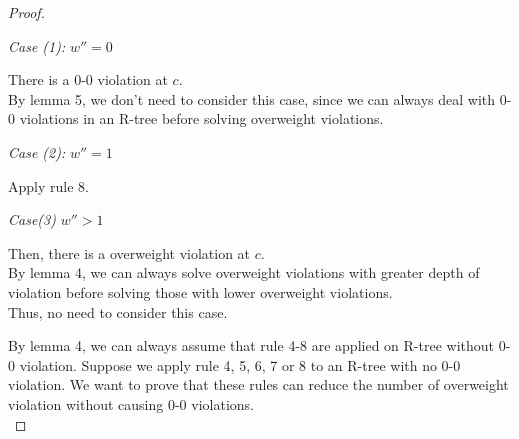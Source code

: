 \documentclass[10pt]{article}
\begin{document}
\begin{enumerate}
\begin{proof}
\begin{addmargin}[1em]{0em}
\begin{addmargin}[1em]{0em}
			\textit{Case (1):} $w'' = 0$
			\begin{addmargin}[1em]{0em}
				There is a 0-0 violation at $c$. \\
				By lemma 5, we don't need to consider this case, since we can always deal with 0-0 violations in an R-tree before solving overweight violations.
			\end{addmargin}
			\textit{Case (2):} $w'' = 1$
			\begin{addmargin}[1em]{0em}
				Apply rule 8.
			\end{addmargin}
			\textit{Case(3)} $w'' > 1$
			\begin{addmargin}[1em]{0em}
				Then, there is a overweight violation at $c$. \\
				By lemma 4, we can always solve overweight violations with greater depth of violation before solving those with lower overweight violations. \\
				Thus, no need to consider this case.
			\end{addmargin}
		\end{addmargin}
	\end{addmargin}

	By lemma 4, we can always assume that rule 4-8 are applied on R-tree
	without 0-0 violation. Suppose we apply rule 4, 5, 6, 7 or 8 to an R-tree
	with no 0-0 violation. We want to prove that these rules can reduce the
	number of overweight violation without causing 0-0 violations. \\


\end{proof}
\end{enumerate}
\end{document}

